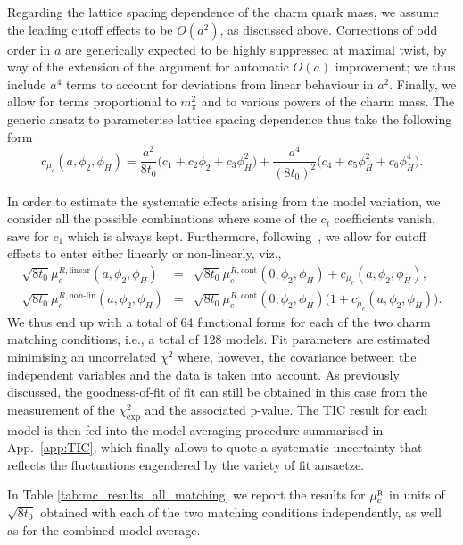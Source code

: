 Regarding the lattice spacing dependence of the charm quark mass, we assume the leading cutoff effects to 
be $O(a^2)$, as discussed above. Corrections of odd order in $a$ are generically expected to be highly
suppressed at maximal twist, by way of the extension of the argument for automatic $O(a)$
improvement; we thus include $a^4$ terms to account for deviations from linear behaviour
in $a^2$. Finally, we allow for terms proportional to $m_\pi^2$ and to various powers of the charm
mass. The generic ansatz to parameterise lattice spacing dependence thus take the following form
\begin{equation}
	c_{\mu_c}(a, \phi_2, \phi_H) = \frac{a^2}{8t_0} \big(
	c_1 + c_2\phi_2 + c_3 \phi_H^2
	\big)
	+
	\frac{a^4}{(8t_0)^2}\big(
	c_4 + c_5\phi_H^2 + c_6 \phi_H^4
	\big).
	\label{eq:lattice_spacing_dependence}
\end{equation} 

In order to estimate the systematic effects arising from the model variation, we consider all the possible 
combinations where some of the $c_i$ coefficients vanish, save for $c_1$ which is always kept.
Furthermore, following~\cite{Heitger:2021apz}, we allow for cutoff effects to enter either linearly or 
non-linearly, viz.,
  \begin{eqnarray} 	\label{eq:tot_model}
 	\sqrt{8t_0}\mu_c^{R,\text{linear}}(a, \phi_2,\phi_H) &=&
 	\sqrt{8t_0}\mu_c^{R,\text{cont}}(0, \phi_2,\phi_H) + c_{\mu_c}(a, \phi_2,\phi_H),
 	\\
 	\sqrt{8t_0}\mu_c^{R,\text{non-lin}}(a, \phi_2,\phi_H) &=& 
 	\sqrt{8t_0}\mu_c^{R,\text{cont}}(0, \phi_2,\phi_H) \big(1+ c_{\mu_c}(a, \phi_2,\phi_H)\big). \nonumber
 \end{eqnarray}
We thus end up with a total of 64 functional forms for each of the two charm matching conditions,
i.e., a total of 128 models.
Fit parameters are estimated minimising an uncorrelated
$\chi^2$ where, however, the covariance between the independent variables and the data is taken into account. As previously discussed, the goodness-of-fit of fit can still be obtained in this case from the measurement of the $\chi^2_{\mathrm{exp}}$ and the associated p-value. The TIC result for each model is then fed into the model averaging procedure summarised in App.~\ref{app:TIC},
which finally allows to quote a systematic uncertainty that reflects the fluctuations
engendered by the variety of fit ansaetze.

In Table \ref{tab:mc_results_all_matching} we report the results for $\mu_c^{\rm\scriptscriptstyle R}$
in units of $\sqrt{8t_0}$ obtained with each of the two matching conditions independently,
as well as for the combined model average.  

